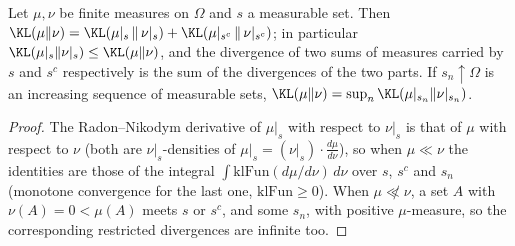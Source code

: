 \begin{lemma}\label{lem:kl_restrict}
\leanok
Let $\mu,\nu$ be finite measures on $\Omega$ and $s$ a measurable set. Then
$\KL(\mu\|\nu) = \KL(\mu|_s\,\|\,\nu|_s) + \KL(\mu|_{s^c}\,\|\,\nu|_{s^c})$; in particular
$\KL(\mu|_s\|\nu|_s) \le \KL(\mu\|\nu)$, and the divergence of two sums of measures carried by
$s$ and $s^c$ respectively is the sum of the divergences of the two parts. If $s_n \uparrow \Omega$
is an increasing sequence of measurable sets, $\KL(\mu\|\nu) = \sup_n \KL(\mu|_{s_n}\|\nu|_{s_n})$.
\end{lemma}

\begin{proof}
\leanok
The Radon--Nikodym derivative of $\mu|_s$ with respect to $\nu|_s$ is that of $\mu$ with respect
to $\nu$ (both are $\nu|_s$-densities of $\mu|_s = (\nu|_s)\cdot\frac{d\mu}{d\nu}$), so when
$\mu\ll\nu$ the identities are those of the integral $\int\mathrm{klFun}(d\mu/d\nu)\,d\nu$ over
$s$, $s^c$ and $s_n$ (monotone convergence for the last one, $\mathrm{klFun}\ge 0$). When
$\mu\not\ll\nu$, a set $A$ with $\nu(A) = 0 < \mu(A)$ meets $s$ or $s^c$, and some $s_n$, with
positive $\mu$-measure, so the corresponding restricted divergences are infinite too.
\end{proof}

